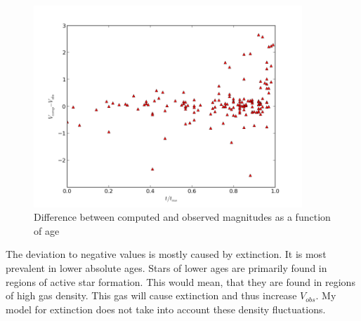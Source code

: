 \documentclass[a4paper,10pt]{article}
\begin{document}
 \begin{figure}[h!]
  \includegraphics[width=0.9\textwidth]{diffmagfracms}
  \caption{Difference between computed and observed magnitudes as a function of age}
 \end{figure}
 
 
 
 The deviation to negative values is mostly caused by extinction. It is most prevalent in lower absolute ages. 
 Stars of lower ages are primarily found in regions of active star formation. This would mean, that they are found in regions
 of high gas density. This gas will cause extinction and thus increase $V_{obs}$. My model for extinction does not take into account 
 these density fluctuations.
 
\end{document}
